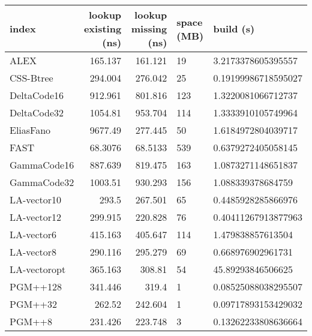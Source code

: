 \begin{tabular}{lrrll}
\hline
 index             &   lookup existing (ns) &   lookup missing (ns) & space (MB)   & build (s)             \\
\hline
 ALEX              &               165.137  &              161.121  & 19           & 3.2173378605395557    \\
 CSS-Btree         &               294.004  &              276.042  & 25           & 0.19199986718595027   \\
 DeltaCode16       &               912.961  &              801.816  & 123          & 1.3220081066712737    \\
 DeltaCode32       &              1054.81   &              953.704  & 114          & 1.3333910105749964    \\
 EliasFano         &              9677.49   &              277.445  & 50           & 1.6184972804039717    \\
 FAST              &                68.3076 &               68.5133 & 539          & 0.6379272405058145    \\
 GammaCode16       &               887.639  &              819.475  & 163          & 1.0873271148651837    \\
 GammaCode32       &              1003.51   &              930.293  & 156          & 1.088339378684759     \\
 LA-vector10       &               293.5    &              267.501  & 65           & 0.4485928285866976    \\
 LA-vector12       &               299.915  &              220.828  & 76           & 0.40411267913877963   \\
 LA-vector6        &               415.163  &              405.647  & 114          & 1.479838857613504     \\
 LA-vector8        &               290.116  &              295.279  & 69           & 0.668976902961731     \\
 LA-vectoropt      &               365.163  &              308.81   & 54           & 45.89293846506625     \\
 PGM++128          &               341.446  &              319.4    & 1            & 0.08525088038295507   \\
 PGM++32           &               262.52   &              242.604  & 1            & 0.09717893153429032   \\
 PGM++8            &               231.426  &              223.748  & 3            & 0.13262233808636664   \\

\end{tabular}
